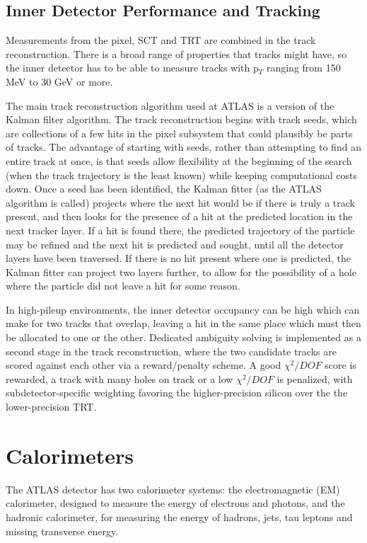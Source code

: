  
\subsection{Inner Detector Performance and Tracking}
\label{sec:id_perf}
Measurements from the pixel, SCT and TRT are combined in the track reconstruction.  There is a broad range of properties that tracks might have, so the inner detector has to be able to measure tracks with p$_T$ ranging from 150 MeV to 30 GeV or more.   

The main track reconstruction algorithm used at ATLAS is a version of the Kalman filter algorithm.  The track reconstruction begins with track seeds, which are collections of a few hits in the pixel subsystem that could plausibly be parts of tracks.  The advantage of starting with seeds, rather than attempting to find an entire track at once, is that seeds allow flexibility at the beginning of the search (when the track trajectory is the least known) while keeping computational costs down.  Once a seed has been identified, the Kalman fitter (as the ATLAS algorithm is called) projects where the next hit would be if there is truly a track present, and then looks for the presence of a hit at the predicted location in the next tracker layer.  If a hit is found there, the predicted trajectory of the particle may be refined and the next hit is predicted and sought, until all the detector layers have been traversed. If there is no hit present where one is predicted, the Kalman fitter can project two layers further, to allow for the possibility of a hole where the particle did not leave a hit for some reason. 

In high-pileup environments, the inner detector occupancy can be high which can make for two tracks that overlap, leaving a hit in the same place which must then be allocated to one or the other.  Dedicated ambiguity solving is implemented as a second stage in the track reconstruction, where the two candidate tracks are scored against each other via a reward/penalty scheme.  A good $\chi^2/DOF$ score is rewarded, a track with many holes on track or a low $\chi^2/DOF$ is penalized, with subdetector-specific weighting favoring the higher-precision silicon over the the lower-precision TRT. 


\section{Calorimeters}
The ATLAS detector has two calorimeter systems: the electromagnetic (EM) calorimeter, designed to measure the energy of electrons and photons, and the hadronic calorimeter, for measuring the energy of hadrons, jets, tau leptons and missing transverse energy.  

